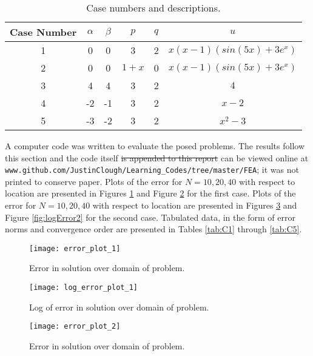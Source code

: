 \documentclass[a4paper, 12pt]{article}
\begin{document}
\begin{table}
\caption{ Case numbers and descriptions.}
\vspace{0.1in}
\centering
\begin{tabular}{ |c|c|c|c|c|c|}
  \hline
  Case Number & $\alpha$ & $\beta$ & $p$ & $q$ & $u$ \\
  \hline
  1           &   0      &  0      &  3  &  2  &  $x(x-1)(sin(5x)+3e^x)$ \\
  \hline
  2           &   0      &  0      &  $1+x$  &  0  &  $x(x-1)(sin(5x)+3e^x)$ \\
  \hline
  3           &   4      &  4      &  3  &  2  &  $4$ \\
  \hline
  4           &   -2     &  -1     &  3  &  2  &  $x-2$ \\
  \hline
  5           &   -3     &  -2     &  3  &  2  &  $x^2-3$ \\
  \hline
\end{tabular}
\label{tab:Cases}
\end{table}

A computer code was written to evaluate the posed problems. 
The results follow this section and the code itself 
\sout{is appended to this report} can be viewed online at 
\texttt{www.github.com/JustinClough/Learning\_Codes/tree/master/FEA}; 
it was not printed to conserve paper.
Plots of the error for $N = 10, 20, 40$ with respect to location are
presented in Figures \ref{fig:Error1} and Figure \ref{fig:logError1} 
for the first case.
Plots of the error for $N = 10, 20, 40$ with respect to location are
presented in Figures \ref{fig:Error2} and Figure \ref{fig:logError2} 
for the second case.
Tabulated data, in the form of error norms and convergence order 
are presented in Tables \ref{tab:C1} through \ref{tab:C5}.

\begin{figure}[H]
  \centering
  \texttt{[image: error\_plot\_1]}
  \caption{ Error in solution over domain of problem.}
  \label{fig:Error1}
\end{figure}

\begin{figure}[H]
  \centering
  \texttt{[image: log\_error\_plot\_1]}
  \caption{ Log of error in solution over domain of problem.}
  \label{fig:logError1}
\end{figure}

\begin{figure}[H]
  \centering
  \texttt{[image: error\_plot\_2]}
  \caption{ Error in solution over domain of problem.}
  \label{fig:Error2}
\end{figure}
\end{document}
